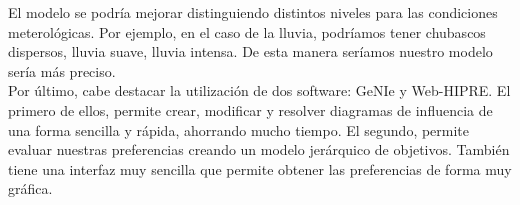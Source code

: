 \documentclass[12pt,a4paper,twoside,openright,titlepage,final]{article}
\begin{document}
El modelo se podría mejorar distinguiendo distintos niveles para las condiciones meterológicas. Por ejemplo, en el caso de la lluvia, podríamos tener chubascos dispersos, lluvia suave, lluvia intensa. De esta manera seríamos nuestro modelo sería más preciso.\\

Por último, cabe destacar la utilización de dos software: GeNIe y Web-HIPRE. El primero de ellos, permite crear, modificar y resolver diagramas de influencia de una forma sencilla y rápida, ahorrando mucho tiempo. El segundo, permite evaluar nuestras preferencias creando un modelo jerárquico de objetivos. También tiene una interfaz muy sencilla que permite obtener las preferencias de forma muy gráfica.  
\end{document}
